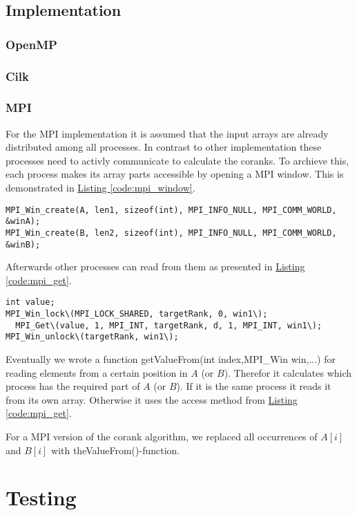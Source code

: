 \subsection{Implementation}

\subsubsection{OpenMP}

\subsubsection{Cilk}

\subsubsection{MPI}
For the MPI implementation it is assumed that the input arrays are already distributed among all processes.
In contrast to other implementation these processes need to activly communicate to calculate the coranks.
To archieve this, each process makes its array parts accessible by opening a MPI window.
This is demonstrated in \hyperref[code:mpi_window]{Listing \ref*{code:mpi_window}}.

\begin{lstlisting}[caption=window to share arrays, label=code:mpi_window,style=c]
MPI_Win_create(A, len1, sizeof(int), MPI_INFO_NULL, MPI_COMM_WORLD, &winA);
MPI_Win_create(B, len2, sizeof(int), MPI_INFO_NULL, MPI_COMM_WORLD, &winB);
\end{lstlisting}

Afterwards other processes can read from them as presented in \hyperref[code:mpi_get]{Listing \ref*{code:mpi_get}}.

\begin{lstlisting}[caption=window to share arrays, label=code:mpi_get,style=c]
int value;
MPI_Win_lock\(MPI_LOCK_SHARED, targetRank, 0, win1\);
  MPI_Get\(value, 1, MPI_INT, targetRank, d, 1, MPI_INT, win1\);
MPI_Win_unlock\(targetRank, win1\);
\end{lstlisting}

Eventually we wrote a function getValueFrom(int index,MPI\_Win win,...) for reading elements from a certain position in $A$ (or $B$).
Therefor it calculates which process has the required part of $A$ (or $B$).
If it is the same process it reads it from its own array.
Otherwise it uses the access method from \hyperref[code:mpi_get]{Listing \ref*{code:mpi_get}}.

For a MPI version of the corank algorithm, we replaced all occurrences of $A[i]$ and $B[i]$ with theValueFrom()-function.
\section{Testing}
